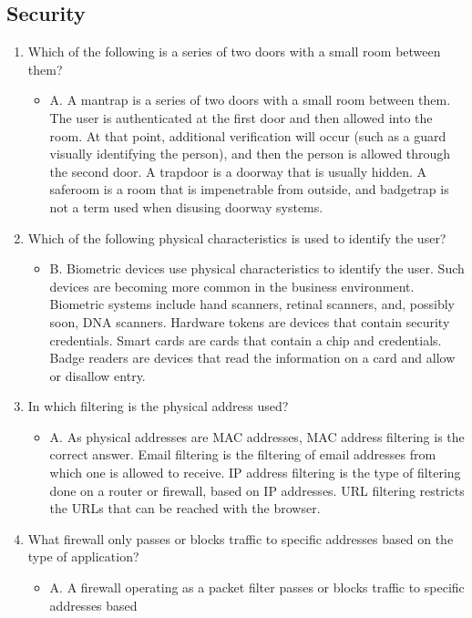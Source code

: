 \documentclass{article}
\begin{document}
\subsection{Security}
\begin{enumerate}
    \item Which of the following is a series of two doors with a small room between them?
    \begin{itemize}
        \item A. A mantrap is a series of two doors with a small room between them. The user is
authenticated at the first door and then allowed into the room. At that point, additional
verification will occur (such as a guard visually identifying the person), and then the
person is allowed through the second door. A trapdoor is a doorway that is usually hidden.
A saferoom is a room that is impenetrable from outside, and badgetrap is not a term used
when disusing doorway systems.
    \end{itemize}
    \item Which of the following physical characteristics is used to identify the user?
    \begin{itemize}
        \item B. Biometric devices use physical characteristics to identify the user. Such devices are
becoming more common in the business environment. Biometric systems include hand
scanners, retinal scanners, and, possibly soon, DNA scanners. Hardware tokens are devices
that contain security credentials. Smart cards are cards that contain a chip and credentials.
Badge readers are devices that read the information on a card and allow or disallow entry.
    \end{itemize}
    \item In which filtering is the physical address used?
    \begin{itemize}
        \item A. As physical addresses are MAC addresses, MAC address filtering is the correct answer.
Email filtering is the filtering of email addresses from which one is allowed to receive. IP
address filtering is the type of filtering done on a router or firewall, based on IP addresses.
URL filtering restricts the URLs that can be reached with the browser.
    \end{itemize}
    \item What firewall only passes or blocks traffic to specific addresses based on the type of
application?
    \begin{itemize}
        \item A. A firewall operating as a packet filter passes or blocks traffic to specific addresses based

\end{itemize}
\end{enumerate}
\end{document}
